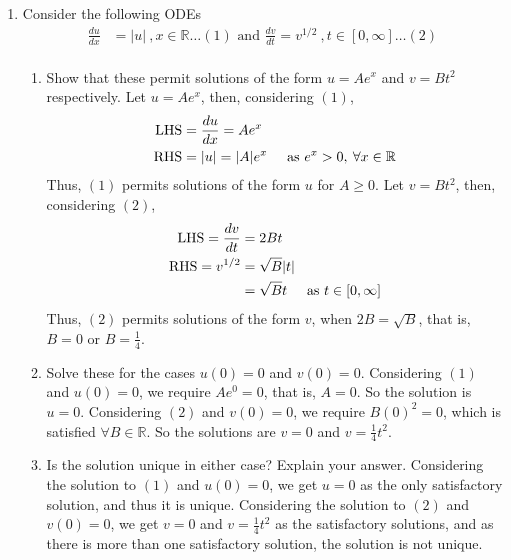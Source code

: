 \documentclass[a4paper]{article}
\newcommand{\ds}{\displaystyle}
\begin{document}
\begin{enumerate}
	\item Consider the following ODEs
	\begin{align*}
		\frac{du}{dx} & = |u| \:, x\in\mathbb{R} \dots (1) \text{ and }
		\frac{dv}{dt} = v^{1/2} \:, t\in [0,\infty] \dots (2)\\
	\end{align*}
	\begin{enumerate}
		\item Show that these permit solutions of the form $\ds{u = Ae^x}$ and $\ds{v = Bt^2}$ respectively.
		\bigbreak 
		Let $\ds{u = Ae^x}$, then, considering $\ds{(1)}$,
		\begin{align*}
			\text{LHS} & = \frac{du}{dx} = Ae^x\\
			\text{RHS} & = |u| = |A|e^x \hspace{5mm} \text{as } e^x > 0,\: \forall x\in\mathbb{R}\\
		\end{align*}
		Thus, $\ds{(1)}$ permits solutions of the form $\ds{u}$ for $\ds{A\geq0}$.
		\bigbreak
		Let $\ds{v = Bt^2}$, then, considering $\ds{(2)}$,
		\begin{align*}
			\text{LHS} = \frac{dv}{dt} & = 2Bt\\
			\text{RHS} = v^{1/2} & = \sqrt{B}|t|\\
			& = \sqrt{B}t \hspace{5mm} \text{as } t\in[0,\infty]\\
		\end{align*}
		Thus, $\ds{(2)}$ permits solutions of the form $\ds{v}$, when $\ds{2B = \sqrt{B}}$, that is, $\ds{B = 0}$ or $\ds{B = \frac{1}{4}}$.
		\bigbreak

		\item Solve these for the cases $\ds{u(0) = 0}$ and $\ds{v(0) = 0}$.
		\bigbreak
		Considering $\ds{(1)}$ and $\ds{u(0) = 0}$, we require $\ds{Ae^0 = 0}$, that is, $\ds{A=0}$. So the solution is $\ds{u = 0}$.
		\bigbreak
		Considering $\ds{(2)}$ and $\ds{v(0) = 0}$, we require $\ds{B(0)^2 = 0}$, which is satisfied $\ds{\forall B\in\mathbb{R}}$. So the solutions are $\ds{v = 0}$ and $\ds{v = \frac{1}{4}t^2}$.
		\bigbreak

		\item Is the solution unique in either case? Explain your answer.
		\bigbreak
		Considering the solution to $\ds{(1)}$ and $\ds{u(0) = 0}$, we get $\ds{u=0}$ as the only satisfactory solution, and thus it is unique.
		\bigbreak
		Considering the solution to $\ds{(2)}$ and $\ds{v(0) = 0}$, we get $\ds{v=0}$ and $\ds{v = \frac{1}{4}t^2}$ as the satisfactory solutions, and as there is more than one satisfactory solution, the solution is not unique.


\end{enumerate}
\end{enumerate}
\end{document}
